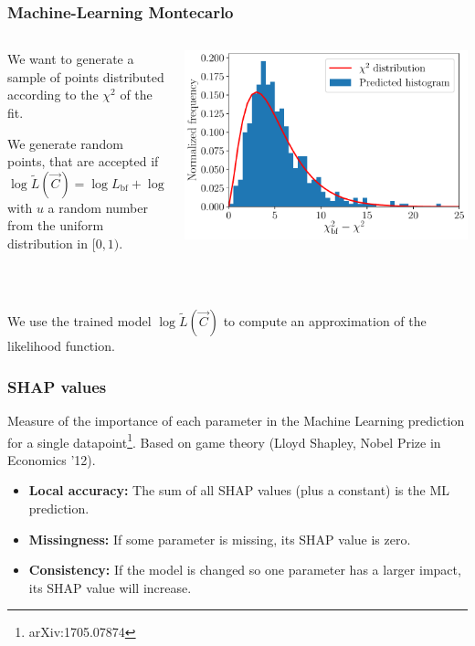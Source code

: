 \documentclass[mathserif, 10pt]{beamer}
\begin{document}
\begin{frame}
    \frametitle{Machine-Learning Montecarlo}
    \begin{columns}
        \begin{column}{0.5\textwidth}
            We want to generate a sample of points distributed according to the $\chi^2$ of the fit.

            We generate random points, that are accepted if
            $$\log \tilde{L}(\vec{C}) = \log L_\mathrm{bf} + \log u\,,$$
            with $u$ a random number from the uniform distribution in $[0,1)$. %
        \end{column}
        \begin{column}{0.5\textwidth}
            \includegraphics[width=\columnwidth]{figures/hist_xgb.pdf}
        \end{column}
    \end{columns}
    
    ~

    We use the trained model $\log\tilde{L}(\vec{C})$ to compute an approximation of the likelihood function.

\end{frame}

\begin{frame}
    \frametitle{SHAP values}

    Measure of the importance of each parameter in the Machine Learning prediction for a single datapoint\footnote[1]{arXiv:1705.07874}. Based on game theory (Lloyd Shapley, Nobel Prize in Economics '12).


    \begin{itemize}
        \item \textbf{Local accuracy:} The sum of all SHAP values (plus a constant) is the ML prediction.
        \item \textbf{Missingness:} If some parameter is missing, its SHAP value is zero.
        \item \textbf{Consistency:} If the model is changed so one parameter has a larger impact, its SHAP value will increase.
    \end{itemize}


\end{frame}
\end{document}
